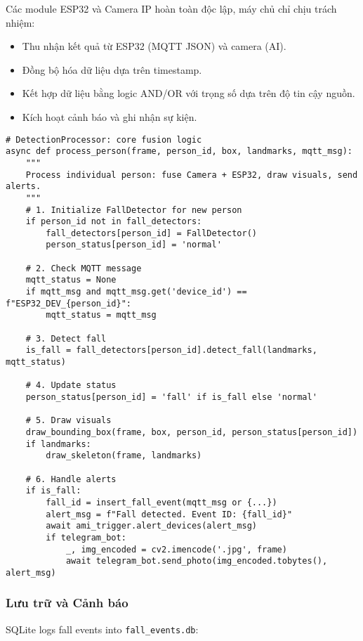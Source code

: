 Các module ESP32 và Camera IP hoàn toàn độc lập, máy chủ chỉ chịu trách nhiệm:
\begin{itemize}
    \item Thu nhận kết quả từ ESP32 (MQTT JSON) và camera (AI).
    \item Đồng bộ hóa dữ liệu dựa trên timestamp.
    \item Kết hợp dữ liệu bằng logic AND/OR với trọng số dựa trên độ tin cậy nguồn.
    \item Kích hoạt cảnh báo và ghi nhận sự kiện.
\end{itemize}

\begin{verbatim}
# DetectionProcessor: core fusion logic
async def process_person(frame, person_id, box, landmarks, mqtt_msg):
    """
    Process individual person: fuse Camera + ESP32, draw visuals, send alerts.
    """
    # 1. Initialize FallDetector for new person
    if person_id not in fall_detectors:
        fall_detectors[person_id] = FallDetector()
        person_status[person_id] = 'normal'

    # 2. Check MQTT message
    mqtt_status = None
    if mqtt_msg and mqtt_msg.get('device_id') == f"ESP32_DEV_{person_id}":
        mqtt_status = mqtt_msg

    # 3. Detect fall
    is_fall = fall_detectors[person_id].detect_fall(landmarks, mqtt_status)

    # 4. Update status
    person_status[person_id] = 'fall' if is_fall else 'normal'

    # 5. Draw visuals
    draw_bounding_box(frame, box, person_id, person_status[person_id])
    if landmarks:
        draw_skeleton(frame, landmarks)

    # 6. Handle alerts
    if is_fall:
        fall_id = insert_fall_event(mqtt_msg or {...})
        alert_msg = f"Fall detected. Event ID: {fall_id}"
        await ami_trigger.alert_devices(alert_msg)
        if telegram_bot:
            _, img_encoded = cv2.imencode('.jpg', frame)
            await telegram_bot.send_photo(img_encoded.tobytes(), alert_msg)
\end{verbatim}

\subsubsection{Lưu trữ và Cảnh báo}
\label{subsubsec:data_storage_alerts}

SQLite logs fall events into \texttt{fall\_events.db}:

